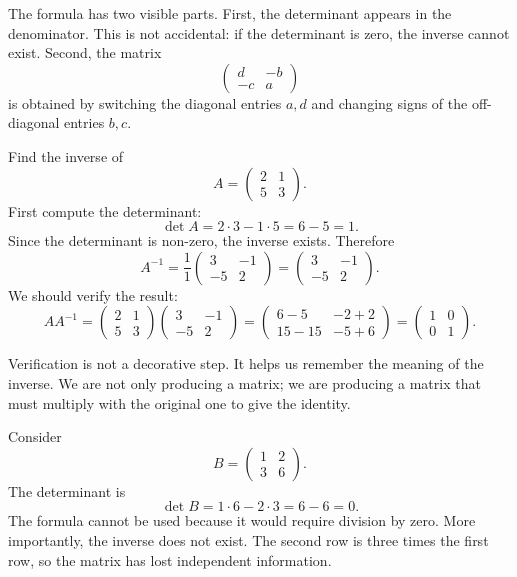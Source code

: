 The formula has two visible parts. First, the determinant appears in the denominator. This is not accidental: if the determinant is zero, the inverse cannot exist. Second, the matrix
\[
\begin{pmatrix}
d&-b\\-c&a
\end{pmatrix}
\]
is obtained by switching the diagonal entries \(a,d\) and changing signs of the off-diagonal entries \(b,c\).

\begin{examplebox}
Find the inverse of
\[
A=\begin{pmatrix}2&1\\5&3\end{pmatrix}.
\]
First compute the determinant:
\[
\det A=2\cdot3-1\cdot5=6-5=1.
\]
Since the determinant is non-zero, the inverse exists. Therefore
\[
A^{-1}=\frac{1}{1}
\begin{pmatrix}
3&-1\\
-5&2
\end{pmatrix}
=
\begin{pmatrix}
3&-1\\
-5&2
\end{pmatrix}.
\]
We should verify the result:
\[
AA^{-1}=\begin{pmatrix}2&1\\5&3\end{pmatrix}
\begin{pmatrix}3&-1\\-5&2\end{pmatrix}
=
\begin{pmatrix}
6-5&-2+2\\
15-15&-5+6
\end{pmatrix}
=
\begin{pmatrix}1&0\\0&1\end{pmatrix}.
\]
\end{examplebox}

Verification is not a decorative step. It helps us remember the meaning of the inverse. We are not only producing a matrix; we are producing a matrix that must multiply with the original one to give the identity.

\begin{examplebox}
Consider
\[
B=\begin{pmatrix}1&2\\3&6\end{pmatrix}.
\]
The determinant is
\[
\det B=1\cdot6-2\cdot3=6-6=0.
\]
The formula cannot be used because it would require division by zero. More importantly, the inverse does not exist. The second row is three times the first row, so the matrix has lost independent information.
\end{examplebox}

